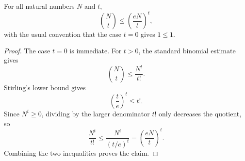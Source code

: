 \begin{lemma}
For all natural numbers \(N\) and \(t\),
\[
  \binom Nt \le \left(\frac{eN}{t}\right)^t,
\]
with the usual convention that the case \(t=0\) gives \(1\le 1\).
\end{lemma}
\begin{proof}
The case \(t=0\) is immediate.  For \(t>0\), the standard binomial estimate gives
\[
  \binom Nt \le \frac{N^t}{t!}.
\]
Stirling's lower bound gives
\[
  \left(\frac{t}{e}\right)^t\le t!.
\]
Since \(N^t\ge 0\), dividing by the larger denominator \(t!\) only decreases the quotient, so
\[
  \frac{N^t}{t!}\le
  \frac{N^t}{(t/e)^t}
  =
  \left(\frac{eN}{t}\right)^t.
\]
Combining the two inequalities proves the claim.
\end{proof}
